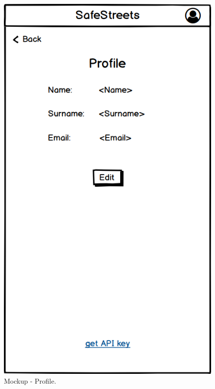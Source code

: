 \begin{@empty}
\begin{figure}[H]
\begin{minipage}{.4\textwidth}
    \includegraphics[width=.8\textwidth]{Images/profile.png}
    \caption{\label{fig:mockup-profile}Mockup - Profile.}
\end{minipage}
\end{figure}


\end{@empty}
